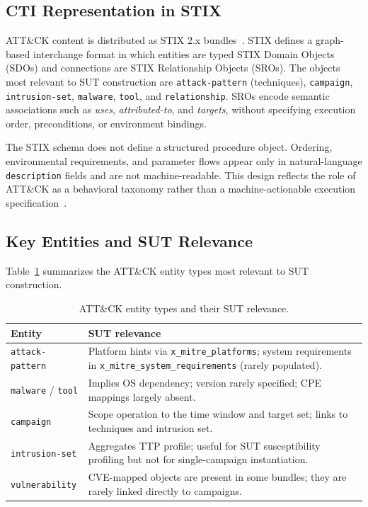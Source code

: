 \documentclass[sigconf,anonymous,review]{acmart}
\newcommand{\stix}{STIX\xspace}
\newcommand{\attack}{ATT\&CK\xspace}
\begin{document}
\subsection{CTI Representation in STIX}

ATT\&CK content is distributed as \stix{} 2.x bundles~\cite{stixspec}. STIX defines a graph-based interchange format in which entities are typed STIX Domain Objects (SDOs) and connections are STIX Relationship Objects (SROs). The objects most relevant to SUT construction are \texttt{attack-pattern} (techniques), \texttt{campaign}, \texttt{intrusion-set}, \texttt{malware}, \texttt{tool}, and \texttt{relationship}. SROs encode semantic associations such as \emph{uses}, \emph{attributed-to}, and \emph{targets}, without specifying execution order, preconditions, or environment bindings.

The \stix{} schema does not define a structured procedure object. Ordering, environmental requirements, and parameter flows appear only in natural-language \texttt{description} fields and are not machine-readable. This design reflects the role of \attack{} as a behavioral taxonomy rather than a machine-actionable execution specification~\cite{strom2018mitre,ferraz2026proceduralsemanticsgapstructured}.

\subsection{Key Entities and SUT Relevance}

Table~\ref{tab:entities} summarizes the \attack{} entity types most relevant to SUT construction.

\begin{table}[!htb]
\caption{ATT\&CK entity types and their SUT relevance.}\label{tab:entities}
\centering\small
\begin{tabular}{>{\raggedright\arraybackslash}p{2.0cm} >{\raggedright\arraybackslash}p{5.6cm}}
\toprule
\textbf{Entity} & \textbf{SUT relevance} \\
\midrule
\texttt{attack-pattern} &
  Platform hints via \texttt{x\_mitre\_platforms}; system requirements in \texttt{x\_mitre\_system\_requirements} (rarely populated). \\
\texttt{malware} / \texttt{tool} &
  Implies OS dependency; version rarely specified; CPE mappings largely absent. \\
\texttt{campaign} &
  Scope operation to the time window and target set; links to techniques and intrusion set. \\
\texttt{intrusion-set} &
  Aggregates TTP profile; useful for SUT susceptibility profiling but not for single-campaign instantiation. \\
\texttt{vulnerability} &
  CVE-mapped objects are present in some bundles; they are rarely linked directly to campaigns. \\
\bottomrule
\end{tabular}
\end{table}
\end{document}
